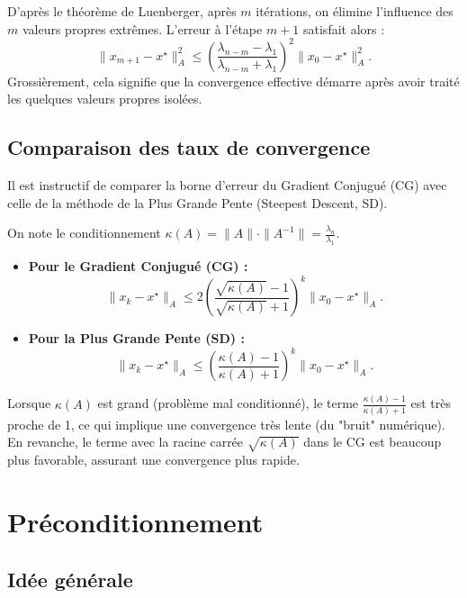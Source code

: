 D'après le théorème de Luenberger, après $m$ itérations, on élimine l'influence des $m$ valeurs propres extrêmes. L'erreur à l'étape $m+1$ satisfait alors :
\[
\|x_{m+1} - x^\star\|_A^2 \le \left( \frac{\lambda_{n-m} - \lambda_1}{\lambda_{n-m} + \lambda_1} \right)^2 \|x_0 - x^\star\|_A^2.
\]
Grossièrement, cela signifie que la convergence effective démarre après avoir traité les quelques valeurs propres isolées.

\subsection{Comparaison des taux de convergence}

Il est instructif de comparer la borne d'erreur du Gradient Conjugué (CG) avec celle de la méthode de la Plus Grande Pente (Steepest Descent, SD).

On note le conditionnement $\kappa(A) = \|A\| \cdot \|A^{-1}\| = \frac{\lambda_n}{\lambda_1}$.

\begin{itemize}
    \item \textbf{Pour le Gradient Conjugué (CG) :}
    \[
    \|x_k - x^\star\|_A \le 2 \left( \frac{\sqrt{\kappa(A)} - 1}{\sqrt{\kappa(A)} + 1} \right)^k \|x_0 - x^\star\|_A.
    \]

    \item \textbf{Pour la Plus Grande Pente (SD) :}
    \[
    \|x_k - x^\star\|_A \le \left( \frac{\kappa(A) - 1}{\kappa(A) + 1} \right)^k \|x_0 - x^\star\|_A.
    \]
\end{itemize}

\begin{remarque}
Lorsque $\kappa(A)$ est grand (problème mal conditionné), le terme $\frac{\kappa(A)-1}{\kappa(A)+1}$ est très proche de 1, ce qui implique une convergence très lente (du "bruit" numérique).
En revanche, le terme avec la racine carrée $\sqrt{\kappa(A)}$ dans le CG est beaucoup plus favorable, assurant une convergence plus rapide.
\end{remarque}

\section{Préconditionnement}
\label{sec:preconditioning}

\subsection{Idée générale}

